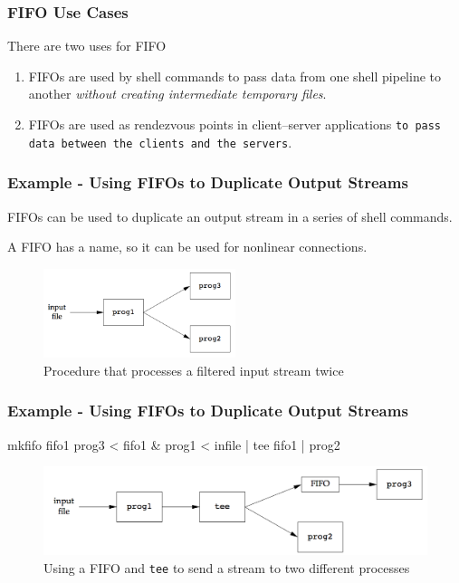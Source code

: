 \documentclass[newPxFont,sthlmFooter,nooffset]{beamer}
\begin{document}
\begin{frame}[t]
  \frametitle{FIFO Use Cases}
There are two uses for FIFO
\begin{enumerate}
\item FIFOs are used by shell commands to pass data from one shell pipeline to another \textit{without creating intermediate temporary files}.
\item FIFOs are used as rendezvous points in client–server applications \texttt{to pass data between the clients and the servers}.
\end{enumerate}

\end{frame}



\begin{frame}[t]
  \frametitle{Example - Using FIFOs to Duplicate Output Streams}

FIFOs can be used to duplicate an output stream in a series of shell commands. 

A FIFO has a name, so it can be used for nonlinear connections.
  \begin{figure}[h]
    \centering
    \includegraphics[width=0.5\textwidth]{figures/fig15_20-procedure.png}
    \caption{Procedure that processes a filtered input stream twice}
  \end{figure}


\end{frame}



\begin{frame}[t,fragile]
  \frametitle{Example - Using FIFOs to Duplicate Output Streams}
\begin{codedefnb}
mkfifo fifo1
prog3 < fifo1 &
prog1 < infile | tee fifo1 | prog2
\end{codedefnb}
  \begin{figure}[h]
    \centering
    \includegraphics[width=1\textwidth]{figures/fig15_21-using.png}
    \caption{Using a FIFO and \texttt{tee} to send a stream to two different processes}
  \end{figure}

\end{frame}
\end{document}
